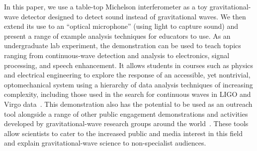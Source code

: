 \documentclass[paper-main.tex]{subfiles}
\begin{document}
In this paper, we use a table-top Michelson interferometer as a toy gravitational-wave detector designed to detect sound instead of gravitational waves. 
We then extend its use to an ``optical microphone'' (using light to capture sound) and present a range of example analysis techniques for educators to use. 
As an undergraduate lab experiment, the demonstration can be used to teach topics ranging from continuous-wave detection and analysis to electronics, signal processing, and speech enhancement. 
It allows students in courses such as physics and electrical engineering to explore the response of an accessible, yet nontrivial, optomechanical system using a hierarchy of data analysis techniques of increasing complexity, including those used in the search for continuous waves in LIGO and Virgo data~\cite{ScoX1O2Viterbi:2019, SuvorovaEtAl:2017,SuvorovaEtAl:2016}. 
This demonstration also has the potential to be used as an outreach tool alongside a range of other public engagement demonstrations and activities developed by gravitational-wave research groups around the world~\cite{TTExhibit:2020,CavagliaExhibit:2009, LIGOScienceEducationCentre:online, GravityDiscoveryCentre:online, GWOSC:online, LOSC:2015, LaserLabs:online, SciVR:online,chirp:online, BlackHoleHunter:online, ArthurJeffesMusic:online, GravitySynthLeonTrimble:online}. 
These tools allow scientists to cater to the increased public and media interest in this field and explain gravitational-wave science to non-specialist audiences.
\end{document}
